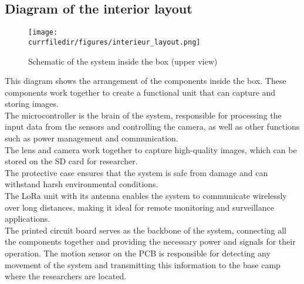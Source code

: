 \newpage
\subsection{Diagram of the interior layout}
\begin{figure}[!h]
    \centering
    \texttt{[image: \\currfiledir/figures/interieur\_layout.png]}
    \caption{Schematic of the system inside the box (upper view)}
\end{figure}

\noindent This diagram shows the arrangement of the components inside the box. These components work together to create a functional unit that can capture and storing images.\\
The microcontroller is the brain of the system, responsible for processing the input data from the sensors and controlling the camera, as well as other functions such as power management and communication.\\
The lens and camera work together to capture high-quality images, which can be stored on the SD card for researcher.\\
The protective case ensures that the system is safe from damage and can withstand harsh environmental conditions.\\
The LoRa unit with its antenna enables the system to communicate wirelessly over long distances, making it ideal for remote monitoring and surveillance applications.\\
The printed circuit board serves as the backbone of the system, connecting all the components together and providing the necessary power and signals for their operation. The motion sensor on the PCB is responsible for detecting any movement of the system and transmitting this information to the base camp where the researchers are located.